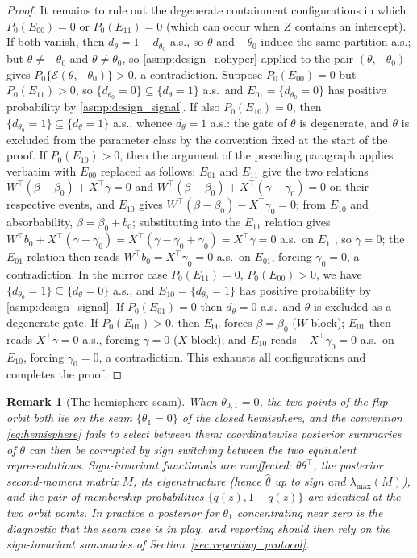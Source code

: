\documentclass[11pt]{article}
\theoremstyle{definition}
\theoremstyle{plain}
\newtheorem{remark}{Remark}
\begin{document}
\begin{proof}
It remains to rule out the degenerate containment configurations in which $P_0(E_{00})=0$ or $P_0(E_{11})=0$ (which can occur when $Z$ contains an intercept). If both vanish, then $d_\theta=1-d_{\theta_0}$ a.s., so $\theta$ and $-\theta_0$ induce the same partition a.s.; but $\theta\neq-\theta_0$ and $\theta\neq\theta_0$, so \ref{asmp:design_nohyper} applied to the pair $(\theta,-\theta_0)$ gives $P_0\{\mathcal E(\theta,-\theta_0)\}>0$, a contradiction. Suppose $P_0(E_{00})=0$ but $P_0(E_{11})>0$, so $\{d_{\theta_0}=0\}\subseteq\{d_\theta=1\}$ a.s.\ and $E_{01}=\{d_{\theta_0}=0\}$ has positive probability by \ref{asmp:design_signal}. If also $P_0(E_{10})=0$, then $\{d_{\theta_0}=1\}\subseteq\{d_\theta=1\}$ a.s., whence $d_\theta=1$ a.s.: the gate of $\theta$ is degenerate, and $\theta$ is excluded from the parameter class by the convention fixed at the start of the proof. If $P_0(E_{10})>0$, then the argument of the preceding paragraph applies verbatim with $E_{00}$ replaced as follows: $E_{01}$ and $E_{11}$ give the two relations $W^\top(\beta-\beta_0)+X^\top\gamma=0$ and $W^\top(\beta-\beta_0)+X^\top(\gamma-\gamma_0)=0$ on their respective events, and $E_{10}$ gives $W^\top(\beta-\beta_0)-X^\top\gamma_0=0$; from $E_{10}$ and absorbability, $\beta=\beta_0+b_0$; substituting into the $E_{11}$ relation gives $W^\top b_0+X^\top(\gamma-\gamma_0)=X^\top(\gamma-\gamma_0+\gamma_0)=X^\top\gamma=0$ a.s.\ on $E_{11}$, so $\gamma=0$; the $E_{01}$ relation then reads $W^\top b_0=X^\top\gamma_0=0$ a.s.\ on $E_{01}$, forcing $\gamma_0=0$, a contradiction. In the mirror case $P_0(E_{11})=0$, $P_0(E_{00})>0$, we have $\{d_{\theta_0}=1\}\subseteq\{d_\theta=0\}$ a.s., and $E_{10}=\{d_{\theta_0}=1\}$ has positive probability by \ref{asmp:design_signal}. If $P_0(E_{01})=0$ then $d_\theta=0$ a.s.\ and $\theta$ is excluded as a degenerate gate. If $P_0(E_{01})>0$, then $E_{00}$ forces $\beta=\beta_0$ ($W$-block); $E_{01}$ then reads $X^\top\gamma=0$ a.s., forcing $\gamma=0$ ($X$-block); and $E_{10}$ reads $-X^\top\gamma_0=0$ a.s.\ on $E_{10}$, forcing $\gamma_0=0$, a contradiction. This exhausts all configurations and completes the proof.
\end{proof}

\begin{remark}[The hemisphere seam]\label{rem:identification_seam}
When $\theta_{0,1}=0$, the two points of the flip orbit both lie on the seam $\{\theta_1=0\}$ of the closed hemisphere, and the convention \eqref{eq:hemisphere} fails to select between them: coordinatewise posterior summaries of $\theta$ can then be corrupted by sign switching between the two equivalent representations. Sign-invariant functionals are unaffected: $\theta\theta^\top$, the posterior second-moment matrix $M$, its eigenstructure (hence $\hat\theta$ up to sign and $\lambda_{\max}(M)$), and the pair of membership probabilities $\{q(z),1-q(z)\}$ are identical at the two orbit points. In practice a posterior for $\theta_1$ concentrating near zero is the diagnostic that the seam case is in play, and reporting should then rely on the sign-invariant summaries of Section~\ref{sec:reporting_protocol}.
\end{remark}
\end{document}
